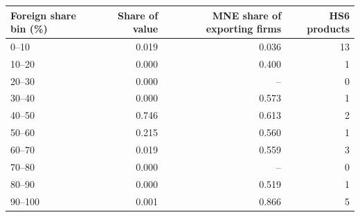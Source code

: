 \begin{tabular}{lrrr}
\toprule
Foreign share bin (\%) & Share of value & MNE share of exporting firms & HS6 products \\
\midrule
0--10 & 0.019 & 0.036 & 13 \\
10--20 & 0.000 & 0.400 & 1 \\
20--30 & 0.000 & -- & 0 \\
30--40 & 0.000 & 0.573 & 1 \\
40--50 & 0.746 & 0.613 & 2 \\
50--60 & 0.215 & 0.560 & 1 \\
60--70 & 0.019 & 0.559 & 3 \\
70--80 & 0.000 & -- & 0 \\
80--90 & 0.000 & 0.519 & 1 \\
90--100 & 0.001 & 0.866 & 5 \\
\bottomrule
\end{tabular}
